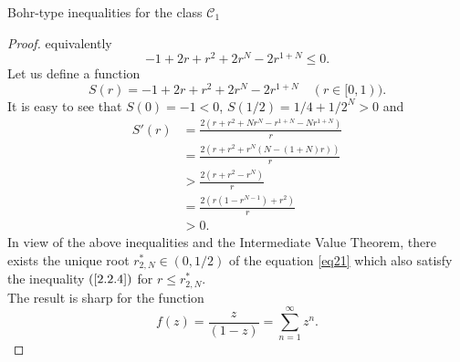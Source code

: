 \documentclass[12pt,a4paper,reqno]{amsart}
\theoremstyle{definition}
\theoremstyle{plain}
\numberwithin{equation}{section}
\begin{document}
\begin{section}{Bohr-type inequalities for the class $\mathcal{C}_1$}
\begin{proof}
equivalently
\[-1+2 r+r^2+2 r^N-2 r^{1+N}\leq0.\]
Let us define a function
\begin{equation*}
S(r)=-1+2 r+r^2+2 r^N-2 r^{1+N}\quad (r\in[0,1 )).
\end{equation*}
It is easy to see that
$S(0)=-1<0$,  $S(1/2)=1/4+1/2^N>0$ and
\begin{align*}
S'(r)&= \frac{2 \left(r+r^2+N r^N-r^{1+N}-N r^{1+N}\right)}{r}\\
&=\frac{2 \left(r+r^2+ r^N(N-(1+N) r)\right)}{r}\\
&>\frac{2 \left(r+r^2- r^N\right)}{r}\\
&=\frac{2 \left(r(1-r^{N-1})+r^2\right)}{r}\\
&>0.
\end{align*}
In view of the above inequalities and the Intermediate Value Theorem, there exists the unique  root $r^*_{2,N}\in(0, 1/2)$ of the equation \eqref{eq21} which also satisfy the inequality $(\ref{2.2.4})$ for $r \le r^*_{2,N}$.
\\
\noindent
The result is sharp for the function
\begin{equation*}
f(z)=\frac{z}{(1-z)}=\sum_{n=1}^{\infty} z^n.
\end{equation*}
\end{proof}


\end{section}
\end{document}
